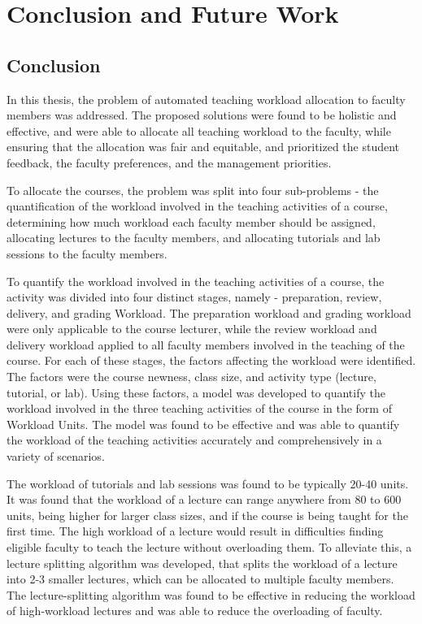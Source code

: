 \chapter{Conclusion and Future Work}

\section{Conclusion}

In this thesis, the problem of automated teaching workload allocation to faculty members was addressed. The proposed solutions were found to be holistic and effective, and were able to allocate all teaching workload to the faculty, while ensuring that the allocation was fair and equitable, and prioritized the student feedback, the faculty preferences, and the management priorities.

To allocate the courses, the problem was split into four sub-problems - the quantification of the workload involved in the teaching activities of a course, determining how much workload each faculty member should be assigned, allocating lectures to the faculty members, and allocating tutorials and lab sessions to the faculty members.

To quantify the workload involved in the teaching activities of a course, the activity was divided into four distinct stages, namely - preparation, review, delivery, and grading Workload. The preparation workload and grading workload were only applicable to the course lecturer, while the review workload and delivery workload applied to all faculty members involved in the teaching of the course. For each of these stages, the factors affecting the workload were identified. The factors were the course newness, class size, and activity type (lecture, tutorial, or lab). Using these factors, a model was developed to quantify the workload involved in the three teaching activities of the course in the form of Workload Units. The model was found to be effective and was able to quantify the workload of the teaching activities accurately and comprehensively in a variety of scenarios.

The workload of tutorials and lab sessions was found to be typically 20-40 units. It was found that the workload of a lecture can range anywhere from 80 to 600 units, being higher for larger class sizes, and if the course is being taught for the first time. The high workload of a lecture would result in difficulties finding eligible faculty to teach the lecture without overloading them. To alleviate this, a lecture splitting algorithm was developed, that splits the workload of a lecture into 2-3 smaller lectures, which can be allocated to multiple faculty members. The lecture-splitting algorithm was found to be effective in reducing the workload of high-workload lectures and was able to reduce the overloading of faculty.

